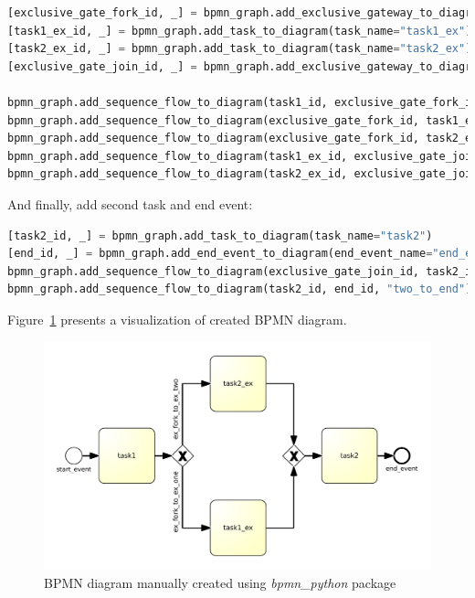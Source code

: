 \begin{lstlisting}[language=python]
[exclusive_gate_fork_id, _] = bpmn_graph.add_exclusive_gateway_to_diagram(gateway_name="exclusive_gate_fork")
[task1_ex_id, _] = bpmn_graph.add_task_to_diagram(task_name="task1_ex")
[task2_ex_id, _] = bpmn_graph.add_task_to_diagram(task_name="task2_ex")
[exclusive_gate_join_id, _] = bpmn_graph.add_exclusive_gateway_to_diagram(gateway_name="exclusive_gate_join")

bpmn_graph.add_sequence_flow_to_diagram(task1_id, exclusive_gate_fork_id, "one_to_ex_fork")
bpmn_graph.add_sequence_flow_to_diagram(exclusive_gate_fork_id, task1_ex_id, "ex_fork_to_ex_one")
bpmn_graph.add_sequence_flow_to_diagram(exclusive_gate_fork_id, task2_ex_id, "ex_fork_to_ex_two")
bpmn_graph.add_sequence_flow_to_diagram(task1_ex_id, exclusive_gate_join_id, "ex_one_to_ex_join")
bpmn_graph.add_sequence_flow_to_diagram(task2_ex_id, exclusive_gate_join_id, "ex_two_to_ex_join")
\end{lstlisting}

And finally, add second task and end event:
\begin{lstlisting}[language=python]
[task2_id, _] = bpmn_graph.add_task_to_diagram(task_name="task2")
[end_id, _] = bpmn_graph.add_end_event_to_diagram(end_event_name="end_event")
bpmn_graph.add_sequence_flow_to_diagram(exclusive_gate_join_id, task2_id, "ex_join_to_two")
bpmn_graph.add_sequence_flow_to_diagram(task2_id, end_id, "two_to_end")
\end{lstlisting}
Figure~\ref{fig:manual_gen_example} presents a visualization of created BPMN diagram.
\begin{figure}[H]
	\centering
	\includegraphics[scale=0.6]{./images/manually_gen_example.pdf}
	\caption{BPMN diagram manually created using \emph{bpmn\_python} package}
	\label{fig:manual_gen_example}
\end{figure}

